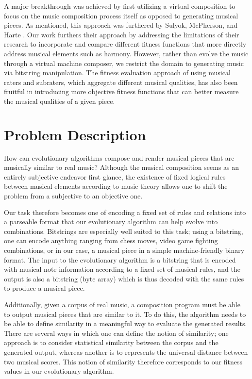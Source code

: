 \documentclass[conference]{IEEEtran}
\begin{document}
A major breakthrough was achieved by first utilizing a virtual composition to focus on the music composition process itself as opposed to generating musical pieces\cite{composer}. As mentioned, this approach was furthered by Sulyok, McPherson, and Harte \cite{b1}. Our work furthers their approach by addressing the limitations of their research to incorporate and compare different fitness functions that more directly address musical elements such as harmony. However, rather than evolve the music through a virtual machine composer, we restrict the domain to generating music via bitstring manipulation. The fitness evaluation approach of using musical raters and subraters\cite{b2}, which aggregate different musical qualities, has also been fruitful in introducing more objective fitness functions that can better measure the musical qualities of a given piece.

\section{Problem Description}
How can evolutionary algorithms compose and render musical pieces that are musically similar to real music? Although the musical composition seems as an entirely subjective endeavor first glance, the existence of fixed logical rules between musical elements according to music theory allows one to shift the problem from a subjective to an objective one.

Our task therefore becomes one of encoding a fixed set of rules and relations into a parseable format that our evolutionary algorithm can help evolve into combinations. Bitstrings are especially well suited to this task; using a bitstring, one can encode anything ranging from chess moves, video game fighting combinations, or in our case, a musical piece in a simple machine-friendly binary format. The input to the evolutionary algorithm is a bitstring that is encoded with musical note information according to a fixed set of musical rules, and the output is also a bitstring (byte array) which is thus decoded with the same rules to produce a musical piece.

Additionally, given a corpus of real music, a composition program must be able to output musical pieces that are similar to it. To do this, the algorithm needs to be able to define similarity in a meaningful way to evaluate the generated results. There are several ways in which one can define the notion of similarity; one approach is to consider statistical similarity between the corpus and the generated output, whereas another is to  represents the universal distance between two musical scores. This notion of similarity therefore corresponds to our fitness values in our evolutionary algorithm.
\end{document}
